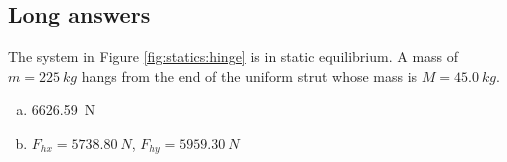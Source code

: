 %
%
\subsection{Long answers}
\question The system in Figure \ref{fig:statics:hinge} is in static equilibrium. A mass of $m=\SI{225}{kg}$ hangs from the end of the uniform strut whose mass is $M=\SI{45.0}{kg}$. 
\begin{finalanswer}
\begin{enumerate}[(a)]
\item \SI{6626.59}{N}
\item $F_{hx}=\SI{5738.80}{N}$, $F_{hy}=\SI{5959.30}{N}$
\end{enumerate}
\end{finalanswer}
